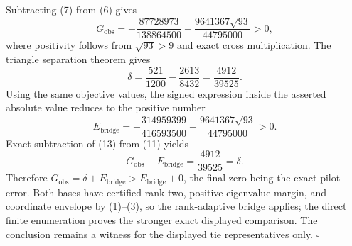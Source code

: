 Subtracting (7) from (6) gives
\[
G_{\mathrm{obs}}
=-\frac{87728973}{138864500}
+\frac{9641367\sqrt{93}}{44795000}>0,
\tag{11}
\]
where positivity follows from \(\sqrt{93}>9\) and exact cross multiplication.  The triangle separation theorem gives
\[
\delta=\frac{521}{1200}-\frac{2613}{8432}
=\frac{4912}{39525}.
\tag{12}
\]
Using the same objective values, the signed expression inside the asserted absolute value reduces to the positive number
\[
E_{\mathrm{bridge}}
=-\frac{314959399}{416593500}
+\frac{9641367\sqrt{93}}{44795000}>0.
\tag{13}
\]
Exact subtraction of (13) from (11) yields
\[
G_{\mathrm{obs}}-E_{\mathrm{bridge}}
=\frac{4912}{39525}=\delta.
\tag{14}
\]
Therefore \(G_{\mathrm{obs}}=\delta+E_{\mathrm{bridge}}>E_{\mathrm{bridge}}+0\), the final zero being the exact pilot error.  Both bases have certified rank two, positive-eigenvalue margin, and coordinate envelope by (1)--(3), so the rank-adaptive bridge applies; the direct finite enumeration proves the stronger exact displayed comparison.  The conclusion remains a witness for the displayed tie representatives only. \(\square\)